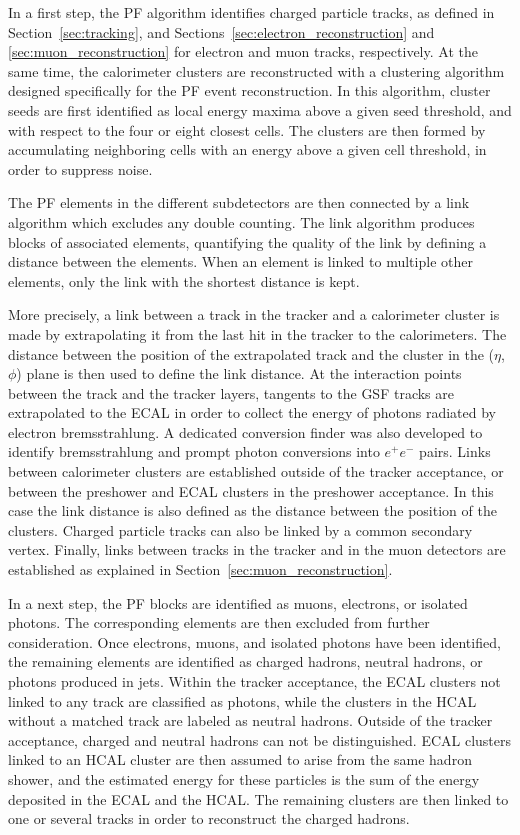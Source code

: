 In a first step, the \ac{PF} algorithm identifies charged particle tracks, as defined in Section~\ref{sec:tracking}, and Sections~\ref{sec:electron_reconstruction} and \ref{sec:muon_reconstruction} for electron and muon tracks, respectively. At the same time, the calorimeter clusters are reconstructed with a clustering algorithm designed specifically for the \ac{PF} event reconstruction. In this algorithm, cluster seeds are first identified as local energy maxima above a given seed threshold, and with respect to the four or eight closest cells. The clusters are then formed by accumulating neighboring cells with an energy above a given cell threshold, in order to suppress noise.

The \ac{PF} elements in the different subdetectors are then connected by a link algorithm which excludes any double counting. The link algorithm produces blocks of associated elements, quantifying the quality of the link by defining a distance between the elements. When an element is linked to multiple other elements, only the link with the shortest distance is kept.

More precisely, a link between a track in the tracker and a calorimeter cluster is made by extrapolating it from the last hit in the tracker to the calorimeters. The distance between the position of the extrapolated track and the cluster in the ($\eta$, $\phi$) plane is then used to define the link distance. At the interaction points between the track and the tracker layers, tangents to the \ac{GSF} tracks are extrapolated to the \ac{ECAL} in order to collect the energy of photons radiated by electron bremsstrahlung. A dedicated conversion finder was also developed to identify bremsstrahlung and prompt photon conversions into $e^+e^-$ pairs. Links between calorimeter clusters are established outside of the tracker acceptance, or between the preshower and \ac{ECAL} clusters in the preshower acceptance. In this case the link distance is also defined as the distance between the position of the clusters. Charged particle tracks can also be linked by a common secondary vertex. Finally, links between tracks in the tracker and in the muon detectors are established as explained in Section~\ref{sec:muon_reconstruction}.

In a next step, the \ac{PF} blocks are identified as muons, electrons, or isolated photons. The corresponding elements are then excluded from further consideration. Once electrons, muons, and isolated photons have been identified, the remaining elements are identified as charged hadrons, neutral hadrons, or photons produced in jets. Within the tracker acceptance, the \ac{ECAL} clusters not linked to any track are classified as photons, while the clusters in the \ac{HCAL} without a matched track are labeled as neutral hadrons. Outside of the tracker acceptance, charged and neutral hadrons can not be distinguished. \ac{ECAL} clusters linked to an \ac{HCAL} cluster are then assumed to arise from the same hadron shower, and the estimated energy for these particles is the sum of the energy deposited in the \ac{ECAL} and the \ac{HCAL}. The remaining clusters are then linked to one or several tracks in order to reconstruct the charged hadrons.

